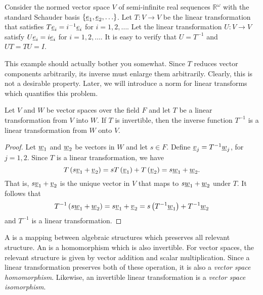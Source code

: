 \begin{example}
Consider the normed vector space $V$ of semi-infinite real sequences $\mathbb{R}^\omega$ with the standard Schauder basis $\{\underline{e}_1,\underline{e}_2,\ldots\}$.
Let $T: V \rightarrow V$ be the linear transformation that satisfies $T \underline{e}_i = i^{-1} \underline{e}_i$ for $i=1,2,\ldots$.
Let the linear transformation $U: V \rightarrow V$ satisfy $U \underline{e}_i = i \underline{e}_i$ for $i=1,2,\ldots$.
It is easy to verify that $U = T^{-1}$ and $UT = TU = I$.
\end{example}
This example should actually bother you somewhat.
Since $T$ reduces vector components arbitrarily, its inverse must enlarge them arbitrarily.
Clearly, this is not a desirable property.
Later, we will introduce a norm for linear transforms which quantifies this problem.

\begin{theorem}
Let $V$ and $W$ be vector spaces over the field $F$ and let $T$ be a linear transformation from $V$ into $W$.
If $T$ is invertible, then the inverse function $T^{-1}$ is a linear transformation from $W$ onto $V$.
\end{theorem}
\begin{proof}
Let $\underline{w}_1$ and $\underline{w}_2$ be vectors in $W$ and let $s \in F$.
Define $\underline{v}_j = T^{-1} \underline{w}_j$, for $j =1,2$.
Since $T$ is a linear transformation, we have
\begin{equation*}
T \left( s \underline{v}_1 + \underline{v}_2 \right)
= s T \left( \underline{v}_1 \right) + T \left( \underline{v}_2 \right)
= s \underline{w}_1 + \underline{w}_2.
\end{equation*}
That is, $s \underline{v}_1 + \underline{v}_2$ is the unique vector in $V$ that maps to $s \underline{w}_1 + \underline{w}_2$ under $T$.
It follows that
\begin{equation*}
T^{-1} \left( s \underline{w}_1 + \underline{w}_2 \right)
= s \underline{v}_1 + \underline{v}_2
= s \left( T^{-1} \underline{w}_1 \right) + T^{-1} \underline{w}_2
\end{equation*}
and $T^{-1}$ is a linear transformation.
\end{proof}

A  is a mapping between algebraic structures which preserves all relevant structure.
An  is a homomorphism which is also invertible.
For vector spaces, the relevant structure is given by vector addition and scalar multiplication.
Since a linear transformation preserves both of these operation, it is also a \emph{vector space homomorphism}.
Likewise, an invertible linear transformation is a \emph{vector space isomorphism}.


